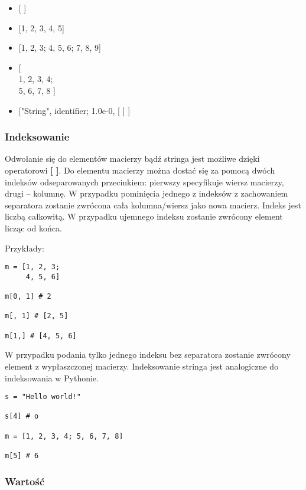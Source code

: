 \documentclass[12pt,a4paper]{article}
\begin{document}
\begin{itemize}

\item {[ ]}

\item {[1, 2, 3, 4, 5]}

\item {[1, 2, 3; 4, 5, 6; 7, 8, 9]}

\item {[\\
        1, 2, 3, 4;\\
        5, 6, 7, 8  ]}
       
\item {["String", identifier; 1.0e-0, [ ] ]}

\end{itemize}

\subsubsection{Indeksowanie}

Odwołanie się do elementów macierzy bądź stringa jest możliwe dzięki operatorowi \textbf{[ ]}. Do elementu macierzy można dostać się za pomocą dwóch indeksów odseparowanych przecinkiem: pierwszy specyfikuje wiersz macierzy, drugi -- kolumnę. W przypadku pominięcia jednego z indeksów z zachowaniem separatora zostanie zwrócona cała kolumna/wiersz jako nowa macierz. Indeks jest liczbą całkowitą. W przypadku ujemnego indeksu zostanie zwrócony element licząc od końca.

\medskip
Przykłady:

\begin{lstlisting}
m = [1, 2, 3;
     4, 5, 6]
     
m[0, 1] # 2

m[, 1] # [2, 5]

m[1,] # [4, 5, 6]
\end{lstlisting}

W przypadku podania tylko jednego indeksu bez separatora zostanie zwrócony element z wypłaszczonej macierzy. Indeksowanie stringa jest analogiczne do indeksowania w Pythonie.

\begin{lstlisting}
s = "Hello world!"

s[4] # o

m = [1, 2, 3, 4; 5, 6, 7, 8]

m[5] # 6
\end{lstlisting}


\subsubsection{Wartość}
\end{document}
